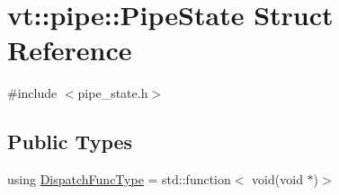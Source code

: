 \hypertarget{structvt_1_1pipe_1_1_pipe_state}{}\section{vt\+:\+:pipe\+:\+:Pipe\+State Struct Reference}
\label{structvt_1_1pipe_1_1_pipe_state}


{\ttfamily \#include $<$pipe\+\_\+state.\+h$>$}

\subsection*{Public Types}
\begin{DoxyCompactItemize}
\item 
using \hyperlink{structvt_1_1pipe_1_1_pipe_state_ad81b637847d9c3185420c58c9272ed7d}{Dispatch\+Func\+Type} = std\+::function$<$ void(void $\ast$)$>$
\end{DoxyCompactItemize}
